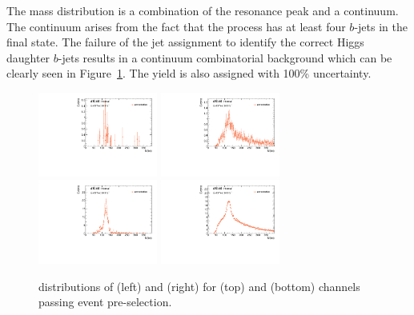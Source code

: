The \ttH mass distribution is a combination of the resonance peak and a continuum. 
The continuum arises from the fact that the \ttH process has at least four $b$-jets in the final state.
The failure of the jet assignment to identify the correct Higgs daughter $b$-jets results in a 
continuum combinatorial background which can be clearly seen in Figure~\ref{fig:Mbb-ttH-VH}. 
The yield is also assigned with 100\% uncertainty.


\begin{figure}[htbp]
  \centering
 \includegraphics[width=0.35\textwidth]{figures/VBF/Mbb_VH_2cen.pdf}
 \includegraphics[width=0.35\textwidth]{figures/VBF/Mbb_ttH_2cen.pdf}\\
 \includegraphics[width=0.35\textwidth]{figures/VBF/Mbb_VH_4cen.pdf}
 \includegraphics[width=0.35\textwidth]{figures/VBF/Mbb_ttH_4cen.pdf}
 \caption{\Mbb distributions of \VH (left) and \ttH (right) for \twocentral (top) and \fourcentral (bottom) channels passing event pre-selection. }
  \label{fig:Mbb-ttH-VH}
\end{figure}

